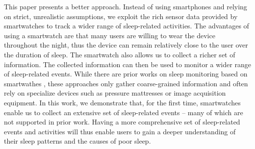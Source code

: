 This paper presents a better approach. Instead of using smartphones and relying on strict, unrealistic assumptions, we exploit the rich
sensor data provided by smartwatches to track a wider range of sleep-related activities. The advantages of using a smartwatch are that
many users are willing to wear the device throughout the night, thus the device can remain relatively close to the user over the duration
of sleep.  The smartwatch also allows us to collect a richer set of information. The collected information can then be used to monitor a
wider range of sleep-related events. While there are prior works on sleep monitoring based on smartwathes
\cite{pombo2016ubisleep,shelgikar2016sleep,haescher2015anomaly,borazio2012combining}, these approaches only gather coarse-grained
information and often rely on specialize devices such as pressure mattresses or image acquisition equipment. In this work, we demonstrate
that, for the first time, smartwatches enable us to collect an extensive set of sleep-related events -- many of which are not supported in
prior work. Having a more comprehensive set of sleep-related events and activities will thus enable users to gain a deeper understanding of
their sleep patterns and the causes of poor sleep.



